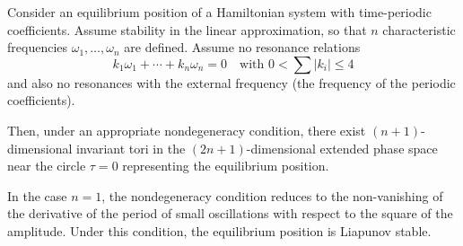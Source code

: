 Consider an equilibrium position of a Hamiltonian system with time-periodic coefficients. Assume stability in the linear approximation, so that $n$ characteristic frequencies $\omega_1, \ldots, \omega_n$ are defined. Assume no resonance relations
$$k_1 \omega_1 + \cdots + k_n \omega_n = 0 \quad \text{with } 0 < \sum |k_i| \leq 4$$
and also no resonances with the external frequency (the frequency of the periodic coefficients).

Then, under an appropriate nondegeneracy condition, there exist $(n+1)$-dimensional invariant tori in the $(2n+1)$-dimensional extended phase space near the circle $\tau = 0$ representing the equilibrium position.

In the case $n = 1$, the nondegeneracy condition reduces to the non-vanishing of the derivative of the period of small oscillations with respect to the square of the amplitude. Under this condition, the equilibrium position is Liapunov stable.
